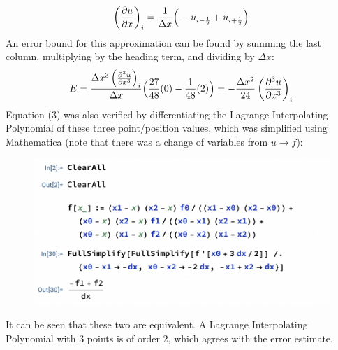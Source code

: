 \documentclass[10pt, reqno]{amsart}
\begin{document}
\begin{multicols}{2}
    \begin{equation}
        \left( \pdv{u}{x} \right)_i = \frac{1}{\Delta x} \Big( -u_{i - \frac{1}{2}} + u_{i + \frac{1}{2}} \Big)
    \end{equation}
    An error bound for this approximation can be found by summing the last column, multiplying by the heading term, and dividing by $\Delta x$:
    \begin{equation}
        E = \frac{\Delta x^3 \left( \pdv[3]{u}{x} \right)_i}{\Delta x} \Big( \frac{27}{48}(0) - \frac{1}{48}(2) \Big) = - \frac{\Delta x^2}{24} \left( \pdv[3]{u}{x} \right)_i
    \end{equation}
    Equation (3) was also verified by differentiating the Lagrange Interpolating Polynomial of these three point/position values, which was simplified using Mathematica (note that there was a change of variables from $u \to f$):
    \begin{figure}[H]
        \centering
        \includegraphics[width=1\linewidth]{Derivation of FD Approximation.png}
    \end{figure}
    It can be seen that these two are equivalent. A Lagrange Interpolating Polynomial with 3 points is of order 2, which agrees with the error estimate.


\end{multicols}
\end{document}
